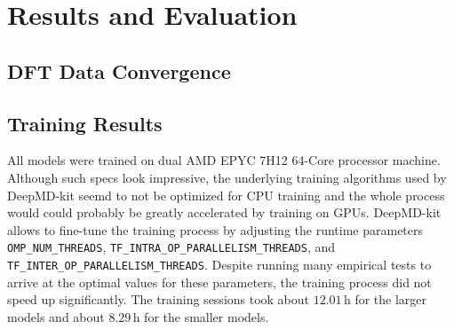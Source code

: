 \chapter{Results and Evaluation}
\label{chap:results-and-evaluation}

\section{DFT Data Convergence}



\section{Training Results}

All models were trained on dual AMD EPYC 7H12 64-Core processor machine.
Although such specs look impressive, the underlying training algorithms used
by DeepMD-kit seemd to not be optimized for CPU training and the whole process
would could probably be greatly accelerated by training on GPUs. DeepMD-kit
allows to fine-tune the training process by adjusting the runtime parameters
\texttt{OMP\_NUM\_THREADS}, \texttt{TF\_INTRA\_OP\_PARALLELISM\_THREADS}, and
\texttt{TF\_INTER\_OP\_PARALLELISM\_THREADS}. Despite running many empirical
tests to arrive at the optimal values for these parameters, the training
process did not speed up significantly. The training sessions took about
$12.01 \, \mathrm{h}$ for the larger models and about $8.29 \, \mathrm{h}$ for
the smaller models.

